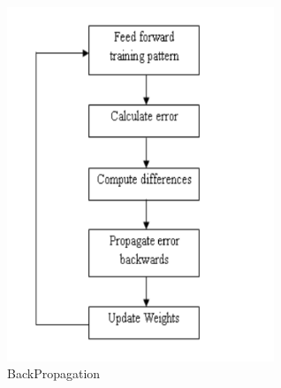 \documentclass[oneside,12pt]{Classes/VTU}
\begin{document}
  \begin{figure}
  	\begin{center}
  			\includegraphics[width=8cm]{images/backpropogation.png}
  			\caption{BackPropagation}
  	\end{center}
  \end{figure}
\end{document}
